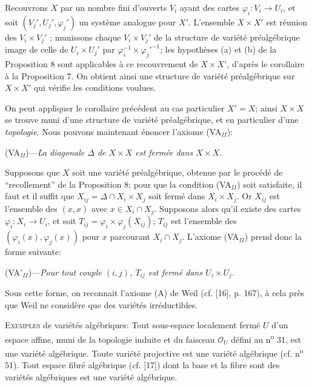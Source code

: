 Recouvrons $X$ par un nombre fini d'ouverts $V_i$ ayant des cartes $\varphi_i : V_i \to U_i$, et soit $(V_j', U_j', \varphi_j')$ un système analogue pour $X'$. L'ensemble $X \times X'$ est réunion des $V_i \times V_j'$ ; munissons chaque $V_i \times V_j'$ de la structure de variété préalgébrique image de celle de $U_i \times U_j'$ par $\varphi_i^{-1} \times {\varphi_j'}^{-1}$; les hypothèses (a) et (b) de la Proposition 8 sont applicables à ce recouvrement de $X \times X'$, d'après le corollaire à la Proposition 7. On obtient ainsi une structure de variété préalgébrique sur $X \times X'$ qui vérifie les conditions voulues.

On peut appliquer le corollaire précédent au cas particulier $X' = X$; ainsi $X \times X$ se trouve muni d'une structure de variété préalgébrique, et en particulier d'une \textit{topologie}. Nous pouvons maintenant énoncer l'axiome (VA$_{II}$):

(VA$_{II}$)---\textit{La diagonale $\Delta$ de $X \times X$ est fermée dans $X \times X$.}

Supposons que $X$ soit une variété préalgébrique, obtenue par le procédé de ``recollement'' de la Proposition 8; pour que la condition (VA$_{II}$) soit satisfaite, il faut et il suffit que $X_{ij} = \Delta \cap X_i \times X_j$ soit fermé dans $X_i \times X_j$. Or $X_{ij}$ est l'ensemble des $(x, x)$ avec $x \in X_i \cap X_j$. Supposons alors qu'il existe des cartes $\varphi_i : X_i \to U_i$, et soit $T_{ij} = \varphi_i \times \varphi_j(X_{ij})$; $T_{ij}$ est l'ensemble des $(\varphi_i(x), \varphi_j(x))$ pour $x$ parcourant $X_i \cap X_j$. L'axiome (VA$_{II}$) prend donc la forme suivante:

(VA$'_{II}$)---\textit{Pour tout couple $(i, j)$, $T_{ij}$ est fermé dans $U_i \times U_j$.}

Sous cette forme, on reconnait l'axiome (A) de Weil (cf. [16], p. 167), à cela près que Weil ne considère que des variétés irréductibles.

\textsc{Exemples} de variétés algébriques: Tout sous-espace localement fermé $U$ d'un espace affine, muni de la topologie induite et du faisceau $\mathcal{O}_U$ défini au n\textsuperscript{o} 31, est une variété algébrique. Toute variété projective est une variété algébrique (cf. n\textsuperscript{o} 51). Tout espace fibré algébrique (cf. [17]) dont la base et la fibre sont des variétés algébriques est une variété algébrique.



